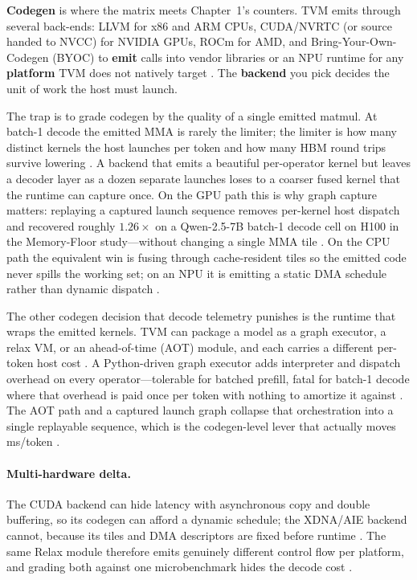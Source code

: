 \textbf{Codegen} is where the matrix meets Chapter~1's counters. TVM emits through several back-ends: LLVM for x86 and ARM CPUs, CUDA/NVRTC (or source handed to NVCC) for NVIDIA GPUs, ROCm for AMD, and Bring-Your-Own-Codegen (BYOC) to \textbf{emit} calls into vendor libraries or an NPU runtime for any \textbf{platform} TVM does not natively target \citep{chen2018tvm,chen2020compilerbasedhardw}. The \textbf{backend} you pick decides the unit of work the host must launch.

The trap is to grade codegen by the quality of a single emitted matmul. At batch-1 decode the emitted MMA is rarely the limiter; the limiter is how many distinct kernels the host launches per token and how many HBM round trips survive lowering \citep{taxbreak2026,memoryfloor2026}. A backend that emits a beautiful per-operator kernel but leaves a decoder layer as a dozen separate launches loses to a coarser fused kernel that the runtime can capture once. On the GPU path this is why graph capture matters: replaying a captured launch sequence removes per-kernel host dispatch and recovered roughly $1.26\times$ on a Qwen-2.5-7B batch-1 decode cell on H100 in the Memory-Floor study---without changing a single MMA tile \citep{memoryfloor2026,nvidia2024cudagraphs}. On the CPU path the equivalent win is fusing through cache-resident tiles so the emitted code never spills the working set; on an NPU it is emitting a static DMA schedule rather than dynamic dispatch \citep{amd2024xdna,amd2024aie}.

The other codegen decision that decode telemetry punishes is the runtime that wraps the emitted kernels. TVM can package a model as a graph executor, a relax VM, or an ahead-of-time (AOT) module, and each carries a different per-token host cost \citep{chen2018tvm,lai2023relax}. A Python-driven graph executor adds interpreter and dispatch overhead on every operator---tolerable for batched prefill, fatal for batch-1 decode where that overhead is paid once per token with nothing to amortize it against \citep{taxbreak2026,kwon2023vllm}. The AOT path and a captured launch graph collapse that orchestration into a single replayable sequence, which is the codegen-level lever that actually moves ms/token \citep{nvidia2024cudagraphs,memoryfloor2026}.

\paragraph{Multi-hardware delta.} The CUDA backend can hide latency with asynchronous copy and double buffering, so its codegen can afford a dynamic schedule; the XDNA/AIE backend cannot, because its tiles and DMA descriptors are fixed before runtime \citep{semianalysis2024tma,amd2024aie}. The same Relax module therefore emits genuinely different control flow per platform, and grading both against one microbenchmark hides the decode cost \citep{dlbook}.


